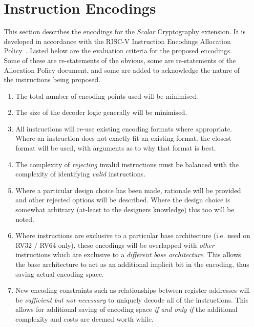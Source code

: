 
\newpage
\section{Instruction Encodings}

This section describes the encodings for the {\em Scalar} Cryptography
extension.
It is developed in accordance with the RISC-V Instruction Encodings
Allocation Policy~\cite{riscv:policy:encodings}.
Listed below are the evaluation criteria for the proposed encodings.
Some of these are re-statements of the obvious, some are re-statements of
the Allocation Policy document, and some are added to acknowledge the
nature of the instructions being proposed.

\begin{enumerate}
\item \label{itm:enc:1}
The total number of encoding points used will be minimised.
\item \label{itm:enc:2}
The size of the decoder logic generally will be minimised.
\item \label{itm:enc:3}
All instructions will re-use existing encoding formats where
appropriate. Where an instruction does not exactly fit an existing format,
the closest format will be used, with arguments as to why that format is
best.
\item \label{itm:enc:4}
The complexity of {\em rejecting} invalid instructions must be balanced with
the complexity of identifying {\em valid} instructions.
\item \label{itm:enc:5}
Where a particular design choice has been made, rationale will be provided
and other rejected options will be described.
Where the design choice is somewhat arbitrary (at-least to the designers
knowledge) this too will be noted.
\item \label{itm:enc:6}
Where instructions are exclusive to a particular base architecture
(i.e. used on RV32 / RV64 only), these encodings will be overlapped with
{\em other} instructions which are exclusive to a {\em different base
architecture}. This allows the base architecture to act as an additional
implicit bit in the encoding, thus saving actual encoding space.
\item \label{itm:enc:7}
New encoding constraints such as relationships between register addresses
will be {\em sufficient but not necessary} to uniquely decode all of
the instructions.
This allows for additional saving of encoding space {\em if and only if}
the additional complexity and costs are deemed worth while.
\end{enumerate}

